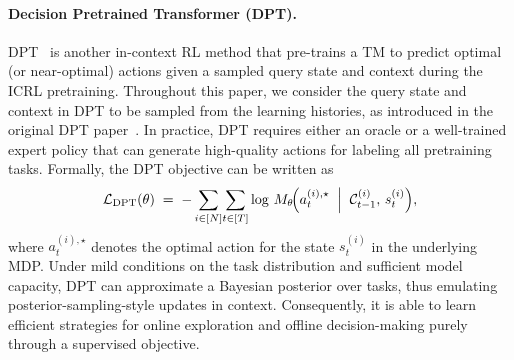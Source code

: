 \documentclass{article}
\newcommand{\gL}{\mathcal{L}}
\def\ccalC{{\ensuremath{\mathcal C}}}
\begin{document}
\paragraph{Decision Pretrained Transformer (DPT).}
DPT~\cite{lee2024supervised} is another in-context RL method that pre-trains a TM to predict optimal (or near-optimal) actions given a sampled query state and context during the ICRL pretraining. Throughout this paper, we consider the query state and context in DPT to be sampled from the learning histories, as introduced in the original DPT paper~\cite{lee2024supervised}.
In practice, DPT requires either an oracle or a well-trained expert policy that can generate high-quality actions for labeling all pretraining tasks.
Formally, the DPT objective can be written as
\begin{equation}
    \label{eq:dpt2}
    \gL_{\mathrm{DPT}}(\theta)
    \;=\;
- \sum_{i \in [N]}\!
  \sum_{t \in [T]}
      \log\,
      M_{\theta}\!\Bigl(
        a_t^{(i), \star}
        \;\Bigm|\;
        \ccalC_{t-1}^{(i)},\,
         s_t^{(i)}
      \Bigr),
\end{equation}
where $a_t^{(i), \star}$ denotes the optimal action for the state $s_t^{(i)}$ in the underlying MDP.
Under mild conditions on the task distribution and sufficient model capacity, DPT can approximate a Bayesian posterior over tasks, thus emulating posterior-sampling-style updates in context. Consequently, it is able to learn efficient strategies for online exploration and offline decision-making purely through a supervised objective.
\end{document}
